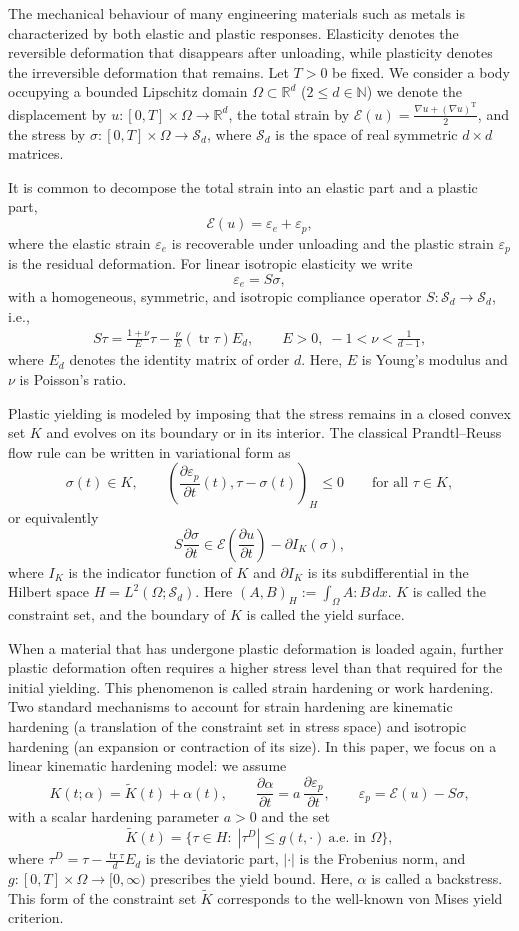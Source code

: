 \documentclass[11pt, a4paper]{article}
\newcommand{\R}{{\mathbb R}}
\newcommand{\N}{{\mathbb N}}
\newcommand{\Sym}{{\mathcal S}}
\newcommand{\Tp}{{\mathrm T}}
\newcommand{\tr}{\operatorname{tr}}
\newcommand{\prz}[2]{ \frac{\partial{#1}}{\partial{#2}} }
\newcommand{\E}{{\mathcal{E}}}
\newcommand{\Hs}{{H}}
\newcommand{\eps}{\varepsilon}
\begin{document}
The mechanical behaviour of many engineering materials such as metals is characterized by both elastic and plastic responses. Elasticity denotes the reversible deformation that disappears after unloading, while plasticity denotes the irreversible deformation that remains. Let $T>0$ be fixed. We consider a body occupying a bounded Lipschitz domain $\Omega\subset\R^d$ ($2\le d\in\N$) we denote the displacement by $u:[0,T]\times\Omega\to\R^d$, the total strain by $\E(u)=\frac{\nabla u + (\nabla u)^\Tp}{2}$, and the stress by $\sigma:[0,T]\times\Omega\to\Sym_d$, where $\Sym_d$ is the space of real symmetric $d\times d$ matrices.

It is common to decompose the total strain into an elastic part and a plastic part,
\[
    \E(u)=\eps_e+\eps_p,
\]
where the elastic strain $\eps_e$ is recoverable under unloading and the plastic strain $\eps_p$ is the residual deformation. For linear isotropic elasticity we write
\[
    \eps_e=S\sigma,
\]
with a homogeneous, symmetric, and isotropic compliance operator $S:\Sym_d \rightarrow \Sym_d$, i.e.,
\begin{align}\label{def:S}
    S\tau=\frac{1+\nu}{E}\tau-\frac{\nu}{E}(\tr\tau)E_d,
    \qquad E>0,\; -1<\nu<\frac{1}{d-1},
\end{align}
where $E_d$ denotes the identity matrix of order $d$. Here, $E$ is Young's modulus and $\nu$ is Poisson's ratio.

Plastic yielding is modeled by imposing that the stress remains in a closed convex set $K$ and evolves on its boundary or in its interior. The classical Prandtl--Reuss flow rule \cite{Pra28,Reu30} can be written in variational form \cite{DL76} as
\[
    \sigma(t)\in K,\qquad
    \left(\prz{\eps_p}{t}(t),\tau-\sigma(t)\right)_\Hs\le0\qquad\mbox{for all }\tau\in K,
\]
or equivalently
\[
    S\prz{\sigma}{t} \in \E\left(\prz{u}{t}\right) - \partial I_K(\sigma),
\]
where $I_K$ is the indicator function of $K$ and $\partial I_K$ is its subdifferential in the Hilbert space $\Hs=L^2(\Omega;\Sym_d)$. Here $(A,B)_\Hs := \int_\Omega A:B\,dx$. $K$ is called the constraint set, and the boundary of $K$ is called the yield surface.

When a material that has undergone plastic deformation is loaded again, further plastic deformation often requires a higher stress level than that required for the initial yielding. This phenomenon is called strain hardening or work hardening.
Two standard mechanisms to account for strain hardening are kinematic hardening (a translation of the constraint set in stress space) and isotropic hardening (an expansion or contraction of its size). In this paper, we focus on a linear kinematic hardening model: we assume
\[
    K(t;\alpha)=\tilde{K}(t)+\alpha(t),\qquad 
    \prz{\alpha}{t}=a\,\prz{\eps_p}{t},\qquad 
    \eps_p=\E(u)-S\sigma,
\]
with a scalar hardening parameter $a>0$ and the set
\[
    \tilde{K}(t)=\{\tau\in\Hs:\;|\tau^D|\le g(t,\cdot)\ \text{a.e. in }\Omega\},
\]
where $\tau^D=\tau-\tfrac{\tr\tau}{d}E_d$ is the deviatoric part, $|\cdot|$ is the Frobenius norm, and $g:[0,T]\times\Omega\to [0,\infty)$ prescribes the yield bound. Here, $\alpha$ is called a backstress. This form of the constraint set $\tilde{K}$ corresponds to the well-known von Mises yield criterion.
\end{document}
